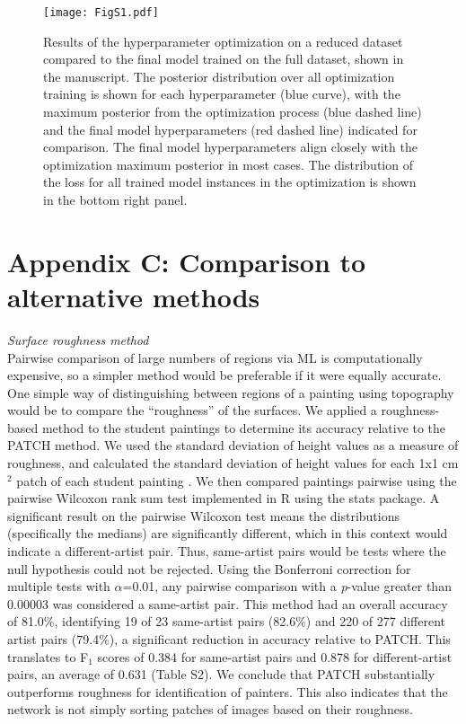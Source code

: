 \documentclass[11pt]{article}
\begin{document}
\begin{figure}[] \centering \texttt{[image: FigS1.pdf]}
\caption{Results of the hyperparameter optimization on a reduced dataset compared to the final model trained on the full dataset, shown in the manuscript. The posterior distribution over all optimization training is shown for each hyperparameter (blue curve), with the maximum posterior from the optimization process (blue dashed line) and the final model hyperparameters (red dashed line) indicated for comparison. The final model hyperparameters align closely with the optimization maximum posterior in most cases. The distribution of the loss for all trained model instances in the optimization is shown in the bottom right panel.}
\end{figure}

\newpage
\section*{\selectfont Appendix C: Comparison to alternative methods}

\noindent\textit{Surface roughness method}\\

Pairwise comparison of large numbers of regions via ML is computationally expensive, so a simpler method would be preferable if it were equally accurate. One simple way of distinguishing between regions of a painting using topography would be to compare the “roughness” of the surfaces. We applied a roughness-based method to the student paintings to determine its accuracy relative to the PATCH method. We used the standard deviation of height values as a measure of roughness, and calculated the standard deviation of height values for each 1x1 cm$^2$ patch of each student painting . We then compared paintings pairwise using the pairwise Wilcoxon rank sum test implemented in R using the stats package. A significant result on the pairwise Wilcoxon test means the distributions (specifically the medians) are significantly different, which in this context would indicate a different-artist pair. Thus, same-artist pairs would be tests where the null hypothesis could not be rejected. Using the Bonferroni correction for multiple tests with $\alpha$=0.01, any pairwise comparison with a \textit{p}-value greater than 0.00003 was considered a same-artist pair. This method had an overall accuracy of 81.0\%,  identifying 19 of 23 same-artist pairs (82.6\%) and 220 of 277 different artist pairs (79.4\%), a significant reduction in accuracy relative to PATCH. This translates to F$_1$ scores of 0.384 for same-artist pairs and 0.878 for different-artist pairs, an average of 0.631 (Table S2). We conclude that PATCH substantially outperforms roughness for identification of painters. This also indicates that the network is not simply sorting patches of images based on their roughness.
\end{document}
